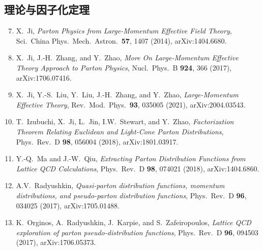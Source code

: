 \documentclass[11pt,a4paper]{ctexart}
\newcommand{\LaMET}{\text{LaMET}}
\begin{document}
\subsection*{\LaMET{} 理论与因子化定理}
\begin{enumerate}\setcounter{enumi}{6}
  \item X.~Ji, \textit{Parton Physics from Large-Momentum Effective
  Field Theory}, Sci.\ China Phys.\ Mech.\ Astron.\ \textbf{57}, 1407
  (2014), arXiv:1404.6680.
  \item X.~Ji, J.-H.~Zhang, and Y.~Zhao, \textit{More On Large-Momentum
  Effective Theory Approach to Parton Physics}, Nucl.\ Phys.\ B
  \textbf{924}, 366 (2017), arXiv:1706.07416.
  \item X.~Ji, Y.-S.~Liu, Y.~Liu, J.-H.~Zhang, and Y.~Zhao,
  \textit{Large-Momentum Effective Theory}, Rev.\ Mod.\ Phys.\ \textbf{93},
  035005 (2021), arXiv:2004.03543.
  \item T.~Izubuchi, X.~Ji, L.~Jin, I.W.~Stewart, and Y.~Zhao,
  \textit{Factorization Theorem Relating Euclidean and Light-Cone Parton
  Distributions}, Phys.\ Rev.\ D \textbf{98}, 056004 (2018),
  arXiv:1801.03917.
  \item Y.-Q.~Ma and J.-W.~Qiu, \textit{Extracting Parton Distribution
  Functions from Lattice QCD Calculations}, Phys.\ Rev.\ D \textbf{98},
  074021 (2018), arXiv:1404.6860.
  \item A.V.~Radyushkin, \textit{Quasi-parton distribution functions,
  momentum distributions, and pseudo-parton distribution functions},
  Phys.\ Rev.\ D \textbf{96}, 034025 (2017), arXiv:1705.01488.
  \item K.~Orginos, A.~Radyushkin, J.~Karpie, and S.~Zafeiropoulos,
  \textit{Lattice QCD exploration of parton pseudo-distribution
  functions}, Phys.\ Rev.\ D \textbf{96}, 094503 (2017),
  arXiv:1706.05373.
\end{enumerate}
\end{document}
